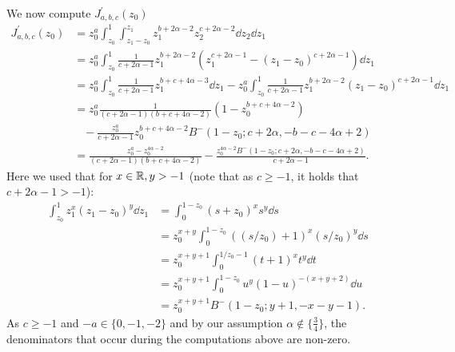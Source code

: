 We now compute $J_{a,b,c}^\prime(z_0)$
\begin{align*}
	J_{a,b,c}^\prime(z_0) 
	&= z_0^a \int_{z_0}^1 \int_{z_1-z_0}^{z_1}  z_1^{b+2\alpha-2} z_2^{c+2\alpha-2} \dd z_2 \dd z_1  \\
 	&= z_0^a \int_{z_0}^1 \frac{1}{c+2\alpha-1}  z_1^{b+2\alpha-2}( z_1^{c+2\alpha-1}-(z_1-z_0)^{c+2\alpha-1})  \dd z_1  \\
 	&=z_0^a \int_{z_0}^1 \frac{1}{c+2\alpha-1} z_1^{b+c+4\alpha-3} {\dd } z_1 -z_0^{a} \int_{z_0}^1 	
 		\frac{1}{c+2\alpha-1}z_1^{b+2\alpha-2}(z_1-z_0)^{c+2\alpha-1}  \dd z_1  \\
 	&= z_0^a  \frac{1}{(c+2\alpha-1)(b+c+4\alpha-2)}(1-z_0^{b+c+4\alpha-2}) \\
 	&\hspace{10pt}- \frac{z_0^a}{c+2\alpha-1}z_0^{b+c+4\alpha-2}B^-(1-z_0;c+2\alpha,-b-c-4\alpha+2) \\
	&= \frac{z_0^a -z_0^{4\alpha-2}}{(c+2\alpha-1)(b+c+4\alpha-2)}  
		- \frac{z_0^{4\alpha -2}B^-(1-z_0;c+2\alpha,-b-c-4\alpha+2)}{c+2\alpha-1}.  
\end{align*}
Here we used that for $x  \in {\ensuremath{\mathbb R}},y>-1$ (note that as $c\geq -1$, it holds that $c+2\alpha-1 >-1$):
\begin{align*}
 \int_{z_0}^{1} z_1^x (z_1-z_0)^y \dd z_1 
 &= \int_0^{1-z_0} (s+z_0)^x s^y \dd s \\
 &= z_0^{x+y} \int_0^{1-z_0} \left( (s/z_0) + 1 \right)^x (s/z_0)^y \dd s \\
 &= z_0^{x+y+1} \int_{0}^{1/z_0 -1 } (t+1)^x t^y \dd t \\
 &= z_0^{x+y+1} \int_0^{1-z_0} u^y (1-u)^{-(x+y+2)} \dd u \\
 &= z_0^{x+y+1} B^-(1-z_0; y+1,-x-y-1 ).
\end{align*}
As $c \geq -1$ and $-a \in \{0,-1,-2\}$ and by our assumption $\alpha \not \in \{\frac{3}{4}\}$, the denominators 
that occur during the computations above are non-zero. 

